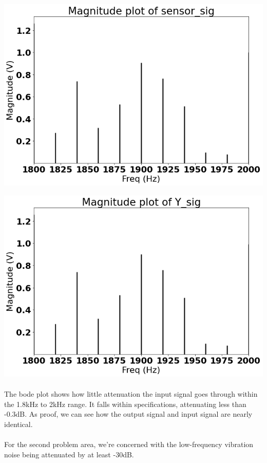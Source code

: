 \documentclass[12pt]{report}
\begin{document}
    \includegraphics[scale = 0.5]{Figure 2022-04-20 163927 (2).png}

    \includegraphics[scale = 0.5]{Figure 2022-04-20 163927 (13).png}
    
    \paragraph{} The bode plot shows how little attenuation the input signal goes through within the 1.8kHz to 2kHz range. It falls within specifications, attenuating less than -0.3dB. As proof, we can see how the output signal and input signal are nearly identical. 
    
    \paragraph{} For the second problem area, we're concerned with the low-frequency vibration noise being attenuated by at least -30dB.
    
\end{document}
